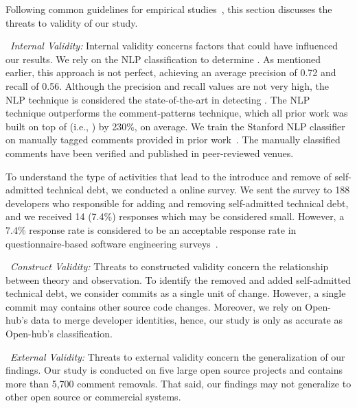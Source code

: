 Following common guidelines for empirical studies~\cite{yin2013case},  this section discusses the threats to validity of our study.

\noindent~\emph{\textit{Internal Validity:}} Internal validity concerns factors that could
have influenced our results. We rely on the NLP classification to determine \SATD. As mentioned earlier, this approach is not perfect, achieving an average precision of 0.72 and recall of 0.56. Although the precision and recall values are not very high, the NLP technique is considered the state-of-the-art in detecting \SATD. The NLP technique outperforms the comment-patterns technique, which all prior work was built on top of (i.e., \cite{Wehaibi2016SANER,Bavota2016MSR,Potdar2014ICSME}) by 230\%, on average. We train the Stanford NLP classifier on manually tagged \SATD comments provided in prior work~\cite{Maldonado2015TSE}. The manually classified comments have been verified and published in peer-reviewed venues. 

To understand the type of activities that lead to the introduce and remove of self-admitted technical debt, we conducted a online survey. We sent the survey to 188 developers who responsible for adding and removing self-admitted technical debt, and we received 14 (7.4\%) responses which may be considered small. However, a 7.4\% response rate is considered to be an acceptable response rate in questionnaire-based software engineering surveys~\cite{singer2008software}.

\noindent~\emph{\textit{Construct Validity:}} Threats to constructed validity concern the relationship between theory and observation.
To identify the removed and added self-admitted technical debt, we consider commits as a single unit of change. However, a single commit may contains other source code changes. Moreover, we rely on Open-hub's data to merge developer identities, hence, our study is only as accurate as Open-hub's classification.

\noindent~\emph{\textit{External Validity:}} Threats to external validity concern the generalization of our findings. Our study is conducted on five large open source projects and contains more than 5,700 comment removals. That said, our findings may not generalize to other open source or commercial systems.